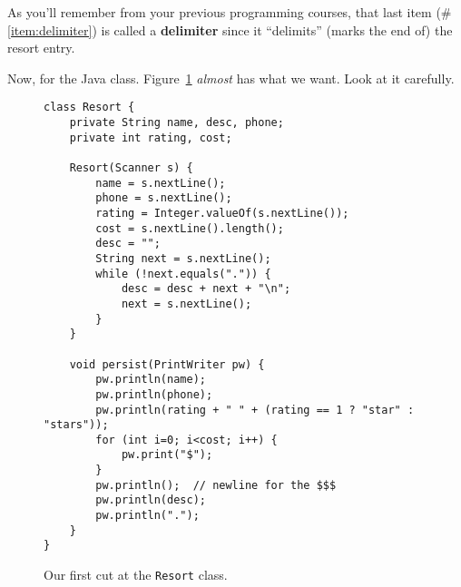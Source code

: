 As you'll remember from your previous programming courses, that last item
(\#\ref{item:delimiter}) is called a \textbf{delimiter} since it ``delimits''
(marks the end of) the resort entry.

Now, for the Java class. Figure~\ref{fig:resort1} \textit{almost} has what we
want. Look at it carefully.

\begin{figure}[ht]
\centering
\begin{Verbatim}[fontsize=\footnotesize,samepage=true,frame=single]
class Resort {
    private String name, desc, phone;
    private int rating, cost;

    Resort(Scanner s) {
        name = s.nextLine();
        phone = s.nextLine();
        rating = Integer.valueOf(s.nextLine());
        cost = s.nextLine().length();
        desc = "";
        String next = s.nextLine();
        while (!next.equals(".")) {
            desc = desc + next + "\n";
            next = s.nextLine();
        }
    }
    
    void persist(PrintWriter pw) {
        pw.println(name);
        pw.println(phone);
        pw.println(rating + " " + (rating == 1 ? "star" : "stars"));
        for (int i=0; i<cost; i++) {
            pw.print("$");
        }
        pw.println();  // newline for the $$$
        pw.println(desc);
        pw.println(".");
    }
}
\end{Verbatim}
\caption{Our first cut at the \texttt{Resort} class.}
\label{fig:resort1}
\end{figure}

